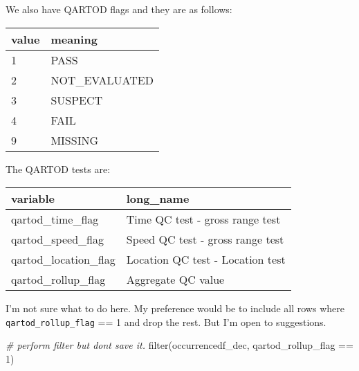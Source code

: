 \documentclass[
]{book}
\newenvironment{Shaded}{\begin{snugshade}}{\end{snugshade}}
\newcommand{\CommentTok}[1]{\textcolor[rgb]{0.56,0.35,0.01}{\textit{#1}}}
\newcommand{\DecValTok}[1]{\textcolor[rgb]{0.00,0.00,0.81}{#1}}
\newcommand{\FunctionTok}[1]{\textcolor[rgb]{0.00,0.00,0.00}{#1}}
\newcommand{\NormalTok}[1]{#1}
\newcommand{\SpecialCharTok}[1]{\textcolor[rgb]{0.00,0.00,0.00}{#1}}
\begin{document}
We also have QARTOD flags and they are as follows:

\begin{longtable}[]{@{}ll@{}}
\toprule
value & meaning \\
\midrule
\endhead
1 & PASS \\
2 & NOT\_EVALUATED \\
3 & SUSPECT \\
4 & FAIL \\
9 & MISSING \\
\bottomrule
\end{longtable}

The QARTOD tests are:

\begin{longtable}[]{@{}ll@{}}
\toprule
variable & long\_name \\
\midrule
\endhead
qartod\_time\_flag & Time QC test - gross range test \\
qartod\_speed\_flag & Speed QC test - gross range test \\
qartod\_location\_flag & Location QC test - Location test \\
qartod\_rollup\_flag & Aggregate QC value \\
\bottomrule
\end{longtable}

I'm not sure what to do here. My preference would be to include all rows where \texttt{qartod\_rollup\_flag} == 1 and drop the rest. But I'm open to suggestions.

\begin{Shaded}
\begin{Highlighting}[]
\CommentTok{\# perform filter but don\textquotesingle{}t save it.}
\FunctionTok{filter}\NormalTok{(occurrencedf\_dec, qartod\_rollup\_flag }\SpecialCharTok{==} \DecValTok{1}\NormalTok{)}
\end{Highlighting}
\end{Shaded}
\end{document}

